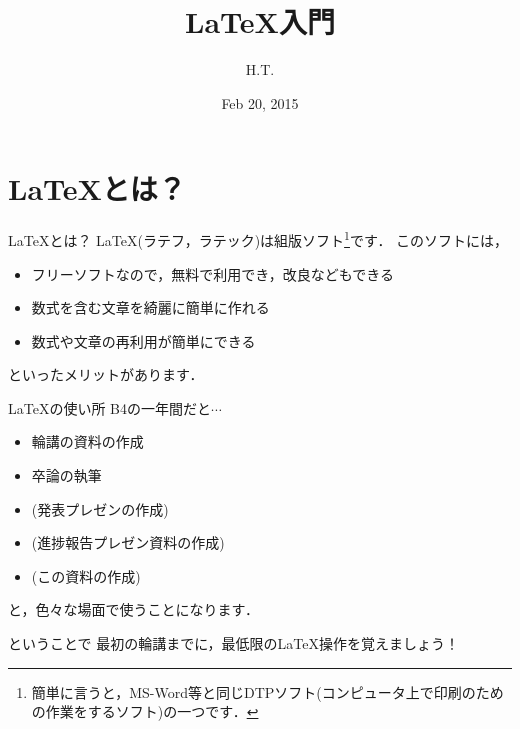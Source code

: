 \documentclass[slide,dvipdfmx]{beamer}
\title{\LaTeX 入門}
\author{H.T.}
\date{Feb 20, 2015}
\begin{document}
\begin{frame}

\titlepage
\end{frame}

\section{\LaTeX とは？}
\begin{frame}{\LaTeX とは？}
\LaTeX (ラテフ，ラテック)は組版ソフト\footnote{簡単に言うと，MS-Word等と同じDTPソフト(コンピュータ上で印刷のための作業をするソフト)の一つです．}です．
このソフトには，
\begin{itemize}
\item フリーソフトなので，無料で利用でき，改良などもできる
\item 数式を含む文章を綺麗に簡単に作れる
\item 数式や文章の再利用が簡単にできる
\end{itemize}
といったメリットがあります．
\end{frame}

\begin{frame}{\LaTeX の使い所}
B4の一年間だと$\cdots$
\begin{itemize}
\item 輪講の資料の作成
\item 卒論の執筆
\item (発表プレゼンの作成)
\item (進捗報告プレゼン資料の作成)
\item (この資料の作成)
\end{itemize}
と，色々な場面で使うことになります．
\end{frame}


\begin{frame}{ということで}
最初の輪講までに，最低限の\LaTeX 操作を覚えましょう！
\end{frame}
\end{document}
